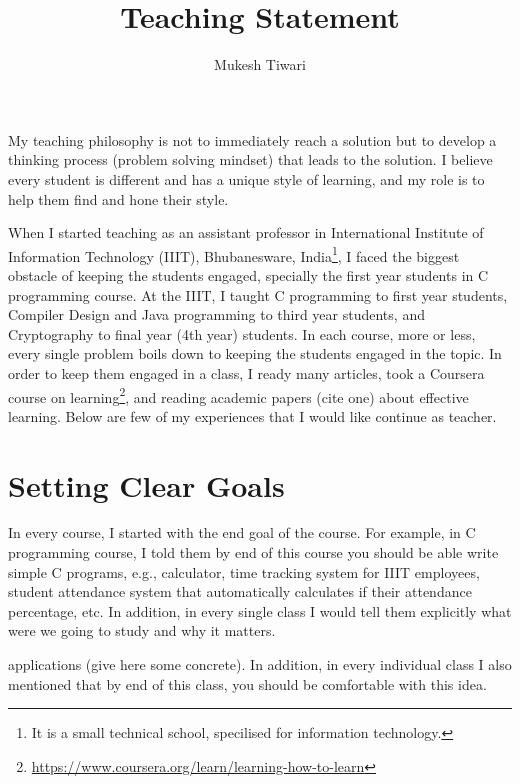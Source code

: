 \documentclass[a4paper]{article}
\title{Teaching Statement}
\author{Mukesh Tiwari}
\begin{document}
\fontsize{12}{15}
\selectfont
\maketitle


My teaching philosophy is not to immediately reach a solution but to develop a 
thinking process (problem solving mindset) that leads to the solution. I believe every 
student is different and has a unique style of learning, and my role is to help them find 
and hone their style.

When I started teaching as an 
assistant professor in International Institute of Information 
Technology (IIIT), Bhubanesware, India\footnote{It is a small technical school, specilised for information technology.},
I faced the biggest obstacle of keeping the students engaged, specially the first year 
students in C programming course. At the IIIT, I taught C programming to 
first year students, Compiler Design and Java programming to third year students, and
Cryptography to final year (4th year) students. In each course, more or less, every single 
problem boils down to keeping the students engaged in the topic. 
In order to keep them engaged in a class, I ready many articles, 
took a Coursera course on learning\footnote{\url{https://www.coursera.org/learn/learning-how-to-learn}}, and 
reading academic papers (cite one) about effective learning. Below are few of 
my experiences that I would like continue as teacher.



\section{Setting Clear Goals}
In every course, I started with the end goal of the course. For example, 
in C programming course, I told them by end of this course you should be 
able write simple C programs, e.g., calculator, time tracking system for IIIT employees,
student attendance system that automatically calculates if their attendance percentage, 
etc. In addition, in every single class I would tell them explicitly what 
were we going to study and why it matters. 



applications (give here some concrete). In addition, 
in every individual class I also mentioned that by end of this 
class, you should be comfortable with this idea. 
\end{document}
